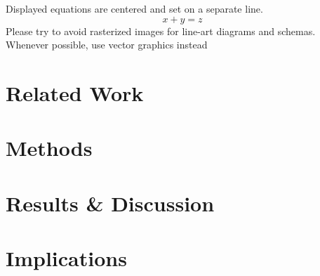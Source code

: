 \documentclass[runningheads]{llncs}
\begin{document}
	
	\noindent Displayed equations are centered and set on a separate
	line.
	\begin{equation}
	x + y = z
	\end{equation}
	Please try to avoid rasterized images for line-art diagrams and
	schemas. Whenever possible, use vector graphics instead 

	\section{Related Work}
	
	\section{Methods}
	
	\section{Results \& Discussion}
	
	\section{Implications}
	
	
	\nocite{*}
	
	
	
\end{document}
